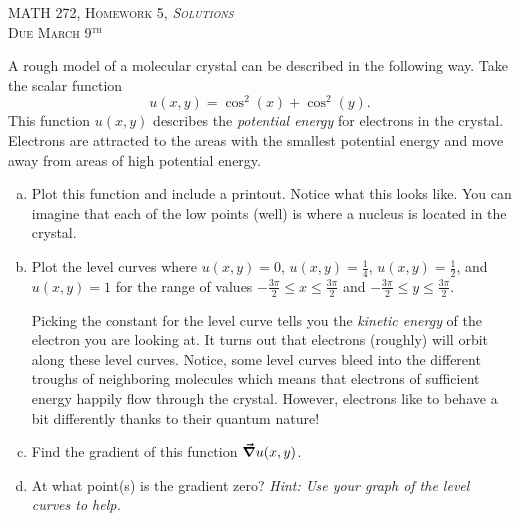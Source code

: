 \documentclass[12pt]{article} %
\begin{document}
\begin{center}
   \textsc{\large MATH 272, Homework 5, \emph{Solutions}}\\
   \textsc{Due March 9$^\textrm{th}$}
\end{center}
\vspace{.5cm}

\begin{problem}
A rough model of a molecular crystal can be described in the following way. Take the scalar function
\[
u(x,y)=\cos^2(x)+\cos^2(y).
\]
This function $u(x,y)$ describes the \emph{potential energy} for electrons in the crystal. Electrons are attracted to the areas with the smallest potential energy and move away from areas of high potential energy. 
\begin{enumerate}[(a)]
    \item Plot this function and include a printout.  Notice what this looks like.  You can imagine that each of the low points (well) is where a nucleus is located in the crystal.
    \item Plot the level curves where $u(x,y)=0$, $u(x,y)=\frac{1}{4}$, $u(x,y)=\frac{1}{2}$, and $u(x,y)=1$ for the range of values $-\frac{3\pi}{2}\leq x \leq \frac{3\pi}{2}$ and $-\frac{3\pi}{2}\leq y \leq \frac{3\pi}{2}$. 
    
    Picking the constant for the level curve tells you the \emph{kinetic energy} of the electron you are looking at.  It turns out that electrons (roughly) will orbit along these level curves.  Notice, some level curves bleed into the different troughs of neighboring molecules which means that electrons of sufficient energy happily flow through the crystal. However, electrons like to behave a bit differently thanks to their quantum nature!
    \item Find the gradient of this function $\boldsymbol{\vec{\nabla}} u(x,y)$.
    \item At what point(s) is the gradient zero? \emph{Hint: Use your graph of the level curves to help.}
    \end{enumerate}
\end{problem}
\end{document}
